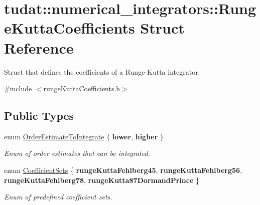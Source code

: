 \hypertarget{structtudat_1_1numerical__integrators_1_1RungeKuttaCoefficients}{}\section{tudat\+:\+:numerical\+\_\+integrators\+:\+:Runge\+Kutta\+Coefficients Struct Reference}
\label{structtudat_1_1numerical__integrators_1_1RungeKuttaCoefficients}


Struct that defines the coefficients of a Runge-\/\+Kutta integrator.  




{\ttfamily \#include $<$runge\+Kutta\+Coefficients.\+h$>$}

\subsection*{Public Types}
\begin{DoxyCompactItemize}
\item 
enum \hyperlink{structtudat_1_1numerical__integrators_1_1RungeKuttaCoefficients_a97f8cb87fe196aa1f07f2355d0e4f8a3}{Order\+Estimate\+To\+Integrate} \{ {\bfseries lower}, 
{\bfseries higher}
 \}\hypertarget{structtudat_1_1numerical__integrators_1_1RungeKuttaCoefficients_a97f8cb87fe196aa1f07f2355d0e4f8a3}{}\label{structtudat_1_1numerical__integrators_1_1RungeKuttaCoefficients_a97f8cb87fe196aa1f07f2355d0e4f8a3}
\begin{DoxyCompactList}\small\item\em Enum of order estimates that can be integrated. \end{DoxyCompactList}
\item 
enum \hyperlink{structtudat_1_1numerical__integrators_1_1RungeKuttaCoefficients_a462b6c2e353f7f84ce09e693fb6c7f17}{Coefficient\+Sets} \{ {\bfseries runge\+Kutta\+Fehlberg45}, 
{\bfseries runge\+Kutta\+Fehlberg56}, 
{\bfseries runge\+Kutta\+Fehlberg78}, 
{\bfseries runge\+Kutta87\+Dormand\+Prince}
 \}\hypertarget{structtudat_1_1numerical__integrators_1_1RungeKuttaCoefficients_a462b6c2e353f7f84ce09e693fb6c7f17}{}\label{structtudat_1_1numerical__integrators_1_1RungeKuttaCoefficients_a462b6c2e353f7f84ce09e693fb6c7f17}
\begin{DoxyCompactList}\small\item\em Enum of predefined coefficient sets. \end{DoxyCompactList}
\end{DoxyCompactItemize}
